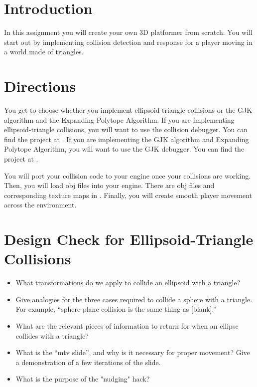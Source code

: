 \documentclass{../cs195u}
\begin{document}
 \section*{Introduction}

In this assignment you will create your own 3D platformer from scratch. You will start out by implementing collision detection and response for a player moving in a world made of triangles.


 \section*{Directions}
  
You get to choose whether you implement ellipsoid-triangle collisions or the GJK algorithm and the Expanding Polytope Algorithm. If you are implementing ellipsoid-triangle collisions, you will want to use the collision debugger. You can find the project at . If you are implementing the GJK algorithm and Expanding Polytope Algorithm, you will want to use the GJK debugger. You can find the project at . 

You will port your collision code to your engine once your collisions are working. Then, you will load obj files into your engine. There are obj files and corresponding texture maps in . Finally, you will create smooth player movement across the environment.


  \section*{Design Check for Ellipsoid-Triangle Collisions}
  \begin{itemize}
   \item What transformations do we apply to collide an ellipsoid with a triangle?
   \item Give analogies for the three cases required to collide a sphere with a triangle. For example, ``sphere-plane collision is the same thing as [blank].''
   \item What are the relevant pieces of information to return for when an ellipse collides with a triangle?
   \item What is the ``mtv slide'', and why is it necessary for proper movement? Give a demonstration of a few iterations of the slide.
   \item What is the purpose of the "nudging" hack?
  \end{itemize}
  
\end{document}
